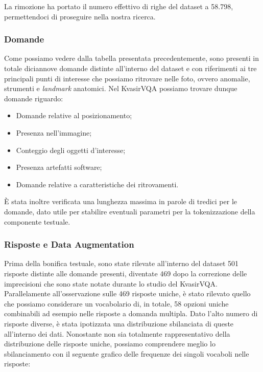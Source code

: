\documentclass[../main.tex]{subfiles}
\begin{document}
La rimozione ha portato il numero effettivo di righe del dataset a 58.798, permettendoci di proseguire nella nostra ricerca.

\subsubsection{Domande}

Come possiamo vedere dalla tabella presentata precedentemente, sono presenti in totale diciannove domande distinte all'interno del dataset e con riferimenti ai tre principali punti di interesse che possiamo ritrovare nelle foto, ovvero anomalie, strumenti e \textit{landmark} anatomici.
Nel KvasirVQA possiamo trovare dunque domande riguardo:

\begin{itemize}
    \item Domande relative al posizionamento;
    \item Presenza nell'immagine;
    \item Conteggio degli oggetti d'interesse;
    \item Presenza artefatti software;
    \item Domande relative a caratteristiche dei ritrovamenti.
\end{itemize}

È stata inoltre verificata una lunghezza massima in parole di tredici per le domande, dato utile per stabilire eventuali parametri per la tokenizzazione della componente testuale.

\subsubsection{Risposte e Data Augmentation}

Prima della bonifica testuale, sono state rilevate all'interno del dataset 501 risposte distinte alle domande presenti, diventate 469 dopo la correzione delle imprecisioni che sono state notate durante lo studio del KvasirVQA. 
Parallelamente all'osservazione sulle 469 risposte uniche, è stato rilevato quello che possiamo considerare un vocabolario di, in totale, 58 opzioni uniche combinabili ad esempio nelle risposte a domanda multipla. 
Dato l'alto numero di risposte diverse, è stata ipotizzata una distribuzione sbilanciata di queste all'interno dei dati. 
Nonostante non sia totalmente rappresentativo della distribuzione delle risposte uniche, possiamo comprendere meglio lo sbilanciamento con il seguente grafico delle frequenze dei singoli vocaboli nelle risposte:
\end{document}

